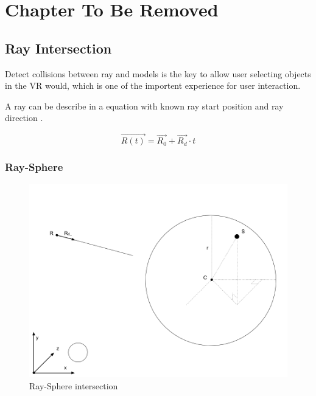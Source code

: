 \label{ChapterX}
\chapter{Chapter To Be Removed}

\section{Ray Intersection}

Detect collisions between ray and models is the key to allow user selecting objects in the VR would, which is one of the importent experience for user interaction.

A ray can be describe in a equation with known ray start position  and ray direction .

\begin{equation}
\label{equ:ray-t}
\overrightarrow{R(t)} = \overrightarrow{R_{0}} + \overrightarrow{R_{d}} \cdot t
\end{equation}

\subsection{Ray-Sphere}

\begin{figure}[h!]
\label{fig:ray-sphere}
\centering
\includegraphics[width=\linewidth]{Figures/ray-sphere-intersection.png}
\decoRule
\caption[ray-sphere-intersection]{Ray-Sphere intersection}
\end{figure}

